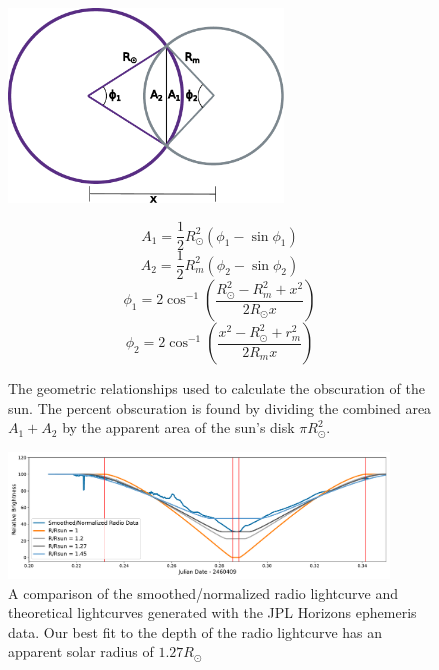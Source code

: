 \begin{figure}
\begin{minipage}{0.49\textwidth}
  \includegraphics[width=0.65\textwidth]{figures/Figure2.pdf}
  \caption{\label{fig:eclipse_geometry} The geometric relationships used to calculate the obscuration of the sun. The percent obscuration is found by dividing the combined area $A_1 + A_2$ by the apparent area of the sun's disk $\pi R_\odot^2$.}
\end{minipage}
\hfill
\begin{minipage}{0.49\textwidth}
\begin{equation}\label{eq:geometry_1}
  A_1 = \frac{1}{2}R_{\odot}^2\left(\phi_1 - \sin\phi_1\right)
\end{equation}
\begin{equation}\label{eq:geometry_2}
  A_2 = \frac{1}{2}R_{m}^2\left(\phi_2 - \sin\phi_2\right)
\end{equation}
\begin{equation}\label{eq:geometry_3}
  \phi_1 = 2\cos^{-1}\left(\frac{R_{\odot}^2 - R_{m}^2+x^2}{2R_{\odot}x}\right)
\end{equation}
\begin{equation}\label{eq:geometry_4}
  \phi_2 = 2\cos^{-1}\left(\frac{x^2 - R_{\odot}^2 + r_{m}^2}{2R_{m}x}\right)
\end{equation}
\end{minipage}
\end{figure}



\begin{figure}
  \includegraphics[width=0.9\textwidth]{figures/Figure3}
  \caption{\label{fig:RadiovsTheoretical} A comparison of the smoothed/normalized radio lightcurve and theoretical lightcurves generated with the JPL Horizons ephemeris data. Our best fit to the depth of the radio lightcurve has an apparent solar radius of $1.27 R_{\odot}$}
\end{figure}

